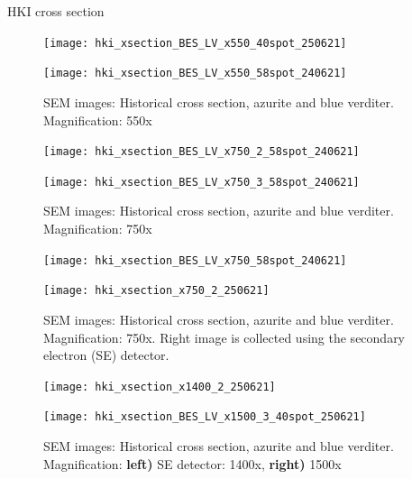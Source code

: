 HKI cross section


\begin{figure}[H]
\centering
\begin{minipage}{.45\textwidth}
  \centering
  \texttt{[image: hki\_xsection\_BES\_LV\_x550\_40spot\_250621]}
\end{minipage}
\begin{minipage}{.45\textwidth}
  \centering
  \texttt{[image: hki\_xsection\_BES\_LV\_x550\_58spot\_240621]}
\end{minipage}
\caption[SEM images: Historical cross section, azurite and blue verditer]{SEM images: Historical cross section, azurite and blue verditer. Magnification: 550x}
\label{fig:xsection_jeol_1}
\end{figure}

\begin{figure}[H]
\centering
\begin{minipage}{.45\textwidth}
  \centering
  \texttt{[image: hki\_xsection\_BES\_LV\_x750\_2\_58spot\_240621]}
\end{minipage}
\begin{minipage}{.45\textwidth}
  \centering
  \texttt{[image: hki\_xsection\_BES\_LV\_x750\_3\_58spot\_240621]}
\end{minipage}
\caption[SEM images: Historical cross section, azurite and blue verditer]{SEM images: Historical cross section, azurite and blue verditer. Magnification: 750x}
\label{fig:xsection_jeol_2}
\end{figure}

\begin{figure}[H]
\centering
\begin{minipage}{.45\textwidth}
  \centering
  \texttt{[image: hki\_xsection\_BES\_LV\_x750\_58spot\_240621]}
\end{minipage}
\begin{minipage}{.45\textwidth}
  \centering
  \texttt{[image: hki\_xsection\_x750\_2\_250621]}
\end{minipage}
\caption[SEM images: Historical cross section, azurite and blue verditer]{SEM images: Historical cross section, azurite and blue verditer. Magnification: 750x. Right image is collected using the secondary electron (SE) detector.}
\label{fig:xsection_jeol_3}
\end{figure}

\begin{figure}[H]
\centering
\begin{minipage}{.45\textwidth}
  \centering
  \texttt{[image: hki\_xsection\_x1400\_2\_250621]}
\end{minipage}
\begin{minipage}{.45\textwidth}
  \centering
  \texttt{[image: hki\_xsection\_BES\_LV\_x1500\_3\_40spot\_250621]}
\end{minipage}
\caption[SEM images: Historical cross section, azurite and blue verditer]{SEM images: Historical cross section, azurite and blue verditer. Magnification: \textbf{left)} SE detector: 1400x, \textbf{right)} 1500x}
\label{fig:xsection_jeol_4}
\end{figure}

